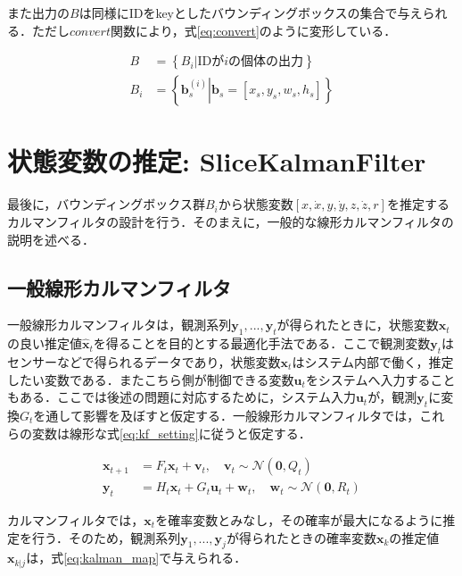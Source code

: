また出力の$B$は同様にIDをkeyとしたバウンディングボックスの集合で与えられる．ただし$convert$関数により，式\ref{eq:convert}のように変形している．

\begin{equation}
    \label{eq:convert}
    \begin{aligned}
        B &= \left\{ \left. B_i \right| \text{IDが$i$の個体の出力}\right\}
        \\ B_i &= \left\{ \left. \bm{b}_s^{(i)} \right| \bm{b}_s = \left[x_s, y_s, w_s, h_s\right]\right\}
    \end{aligned}
\end{equation}

\section{状態変数の推定: SliceKalmanFilter}
最後に，バウンディングボックス群$B_i$から状態変数$\left[x,\dot{x}, y, \dot{y}, z, \dot{z}, r\right]$を推定するカルマンフィルタの設計を行う．そのまえに，一般的な線形カルマンフィルタの説明を述べる．

\subsection{一般線形カルマンフィルタ}

一般線形カルマンフィルタは，観測系列$\bm{y}_1,..., \bm{y}_t$が得られたときに，状態変数$\bm{x}_t$の良い推定値$\hat{\bm{x}}_t$を得ることを目的とする最適化手法である．ここで観測変数$\bm{y}_t$はセンサーなどで得られるデータであり，状態変数$\bm{x}_t$はシステム内部で働く，推定したい変数である．またこちら側が制御できる変数$\bm{u}_t$をシステムへ入力することもある．ここでは後述の問題に対応するために，システム入力$\bm{u}_t$が，観測$\bm{y}_t$に変換$G_t$を通して影響を及ぼすと仮定する．一般線形カルマンフィルタでは，これらの変数は線形な式\ref{eq:kf_setting}に従うと仮定する．

\begin{equation}
    \label{eq:kf_setting}
    \begin{aligned}
        \bm{x}_{t+1} &= F_t \bm{x}_t + \bm{v}_t, \quad \bm{v}_t \sim \mathcal{N}(\bm{0}, Q_t)
        \\ \bm{y}_t &= H_t \bm{x}_t + G_t \bm{u}_t + \bm{w}_t, \quad \bm{w}_t \sim \mathcal{N}(\bm{0}, R_t)
    \end{aligned}
\end{equation}

カルマンフィルタでは，$\bm{x}_t$を確率変数とみなし，その確率が最大になるように推定を行う．そのため，観測系列$\bm{y}_1, ..., \bm{y}_j$が得られたときの確率変数$\bm{x}_k$の推定値$\bm{x}_{k|j}$は，式\ref{eq:kalman_map}で与えられる．

